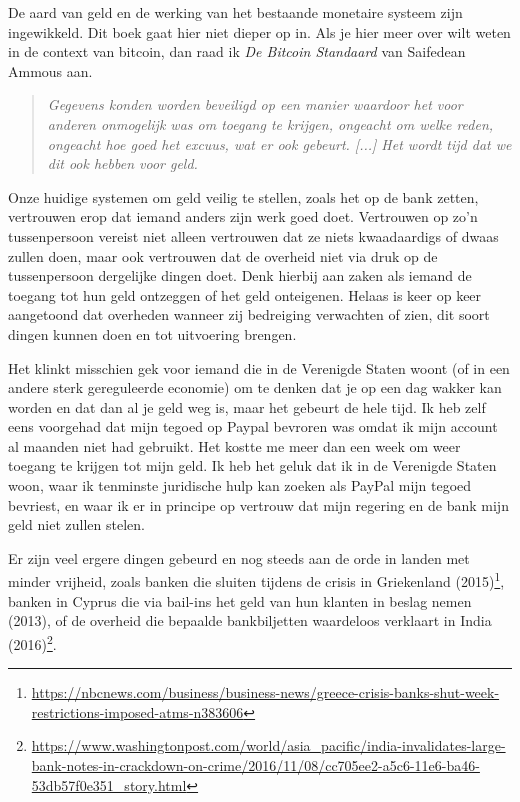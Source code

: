 \documentclass[smalldemyvopaper,11pt,twoside,onecolumn,openright,extrafontsizes]{memoir}
\begin{document}
De aard van geld en de werking van het bestaande monetaire systeem zijn ingewikkeld. Dit boek gaat hier niet dieper op in. Als je hier meer over wilt weten in de context van bitcoin, dan raad ik \textit{De Bitcoin Standaard} van Saifedean Ammous aan.

\begin{quote}
\textit{Gegevens konden worden beveiligd op een manier waardoor het voor anderen onmogelijk was om toegang te krijgen, ongeacht om welke reden, ongeacht hoe goed het excuus, wat er ook gebeurt. [...]
Het wordt tijd dat we dit ook hebben voor geld.} 
\end{quote}

Onze huidige systemen om geld veilig te stellen, zoals het op de bank zetten, vertrouwen erop dat iemand anders zijn werk goed doet. Vertrouwen op zo'n tussenpersoon vereist niet alleen vertrouwen dat ze niets kwaadaardigs of dwaas zullen doen, maar ook vertrouwen dat de overheid niet via druk op de tussenpersoon dergelijke dingen doet. Denk hierbij aan zaken als iemand de toegang tot hun geld ontzeggen of het geld onteigenen. Helaas is keer op keer aangetoond dat overheden wanneer zij bedreiging verwachten of zien, dit soort dingen kunnen doen en tot uitvoering brengen.

Het klinkt misschien gek voor iemand die in de Verenigde Staten woont (of in een andere sterk gereguleerde economie) om te denken dat je op een dag wakker kan worden en dat dan al je geld weg is, maar het gebeurt de hele tijd. Ik heb zelf eens voorgehad dat mijn tegoed op Paypal bevroren was omdat ik mijn account al maanden niet had gebruikt. Het kostte me meer dan een week om weer toegang te krijgen tot \textquotedbl{}mijn\textquotedbl{} geld. Ik heb het geluk dat ik in de Verenigde Staten woon, waar ik tenminste juridische hulp kan zoeken als PayPal mijn tegoed bevriest, en waar ik er in principe op vertrouw dat mijn regering en de bank mijn geld niet zullen stelen.

Er zijn veel ergere dingen gebeurd en nog steeds aan de orde in landen met minder vrijheid, zoals banken die sluiten tijdens de crisis in Griekenland (2015)\footnote{\href{https://www.nbcnews.com/business/business-news/greece-crisis-banks-shut-week-restrictions-imposed-atms-n383606}{https://nbcnews.com/business/business-news/greece-crisis-banks-shut-week-restrictions-imposed-atms-n383606}}, banken in Cyprus die via bail-ins het geld van hun klanten in beslag nemen (2013), of de overheid die bepaalde bankbiljetten waardeloos verklaart in India (2016)\footnote{\href{https://www.washingtonpost.com/world/asia\_pacific/india-invalidates-large-bank-notes-in-crackdown-on-crime/2016/11/08/cc705ee2-a5c6-11e6-ba46-53db57f0e351\_story.html}{https://www.washingtonpost.com/world/asia\_pacific/india-invalidates-large-bank-notes-in-crackdown-on-crime/2016/11/08/cc705ee2-a5c6-11e6-ba46-53db57f0e351\_story.html}}.
\end{document}
